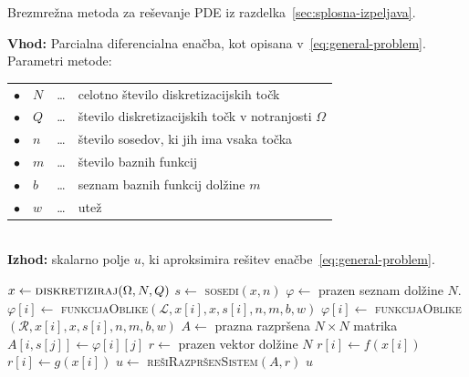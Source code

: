 \documentclass[12pt,a4paper]{article}
\theoremstyle{definition} %
\theoremstyle{plain} %
\newcommand{\Rc}{\mathcal{R}}
\renewcommand{\L}{\mathcal{L}}
\renewcommand{\phi}{\varphi}
\begin{document}
\begin{algorithm}[!ht]
  \caption{Brezmrežna metoda za reševanje PDE iz
  razdelka~\ref{sec:splosna-izpeljava}.}
  \textbf{Vhod:} Parcialna diferencialna enačba, kot opisana
  v~\eqref{eq:general-problem}. Parametri metode: \\
  \newcommand{\listbullet}{\hspace*{10pt}$\bullet$\hspace*{-5pt}}
  \begin{tabular}{llll}
    \listbullet & $N$     & \ldots & celotno število diskretizacijskih točk    \\
    \listbullet & $Q$     & \ldots & število diskretizacijskih točk v
    notranjosti $\Omega$ \\
    \listbullet & $n$     & \ldots & število sosedov, ki jih ima vsaka točka   \\
    \listbullet & $m$     & \ldots & število baznih funkcij                    \\
    \listbullet & $b$ & \ldots & seznam baznih funkcij dolžine $m$         \\
    \listbullet & $w$     & \ldots & utež
  \end{tabular} \\
  \textbf{Izhod:} skalarno polje $u$, ki aproksimira rešitev
  enačbe~\eqref{eq:general-problem}.
  \label{alg:metoda}
  \begin{algorithmic}[1]
    \Function{reši}{$\Omega, \L, f, \Rc, g, N, Q, n, m, b, w$}
    \State $x \gets \textsc{diskretiziraj}(\Omega, N, Q)$
    \State $s \gets $ \textsc{sosedi}$(x, n)$
    \State $\phi \gets$ prazen seznam dolžine $N$.
     
    \State $\phi[i] \gets$ \textsc{funkcijaOblike}$(\L, x[i], x, s[i], n, m, b, w)$
    \EndFor
     
    \State $\phi[i] \gets$ \textsc{funkcijaOblike}$(\Rc, x[i], x, s[i], n, m, b,
    w)$
    \EndFor
    \State $A \gets$ prazna razpršena $N\times N$ matrika
     
    \State $A[i, s[j]] \gets \phi[i][j]$
    \EndFor
    \EndFor
    \State $r \gets$ prazen vektor dolžine $N$
     
    \State $r[i] \gets f(x[i])$
    \EndFor
     
    \State $r[i] \gets g(x[i])$
    \EndFor
    \State $u \gets$ \textsc{rešiRazpršenSistem}$(A, r)$
    \State \Return $u$
    \EndFunction
  \end{algorithmic}
\end{algorithm}
\end{document}
